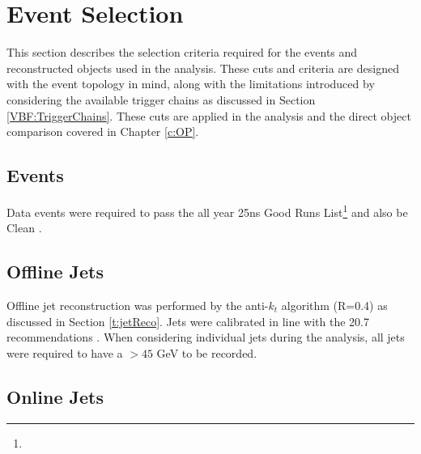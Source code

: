 \chapter{Event Selection}\label{c:ES}

This section describes the selection criteria required for the events and reconstructed objects used in the analysis. These cuts and criteria are designed with the \VBFHBB event topology in mind, along with the limitations introduced by considering the available trigger chains as discussed in Section \ref{VBF:TriggerChains}. These cuts are applied in the \VBFHBB analysis and the direct object comparison covered in Chapter \ref{c:OP}.

\section{Events}

Data events were required to pass the all year 25ns Good Runs List\footnote{}  and also be Clean . 

\section{Offline Jets}

	Offline jet reconstruction was performed by the anti-$k_t$ algorithm (R=0.4) as discussed in Section \ref{t:jetReco}. Jets were calibrated in line with the 20.7 recommendations . When considering individual jets during the analysis, all jets were required to have a \pt $> 45$ GeV to be recorded.
	
\section{Online Jets}
	
